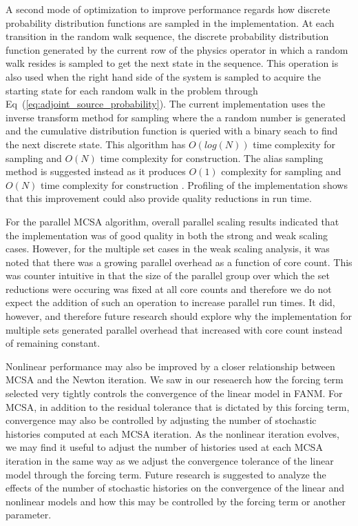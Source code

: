 A second mode of optimization to improve performance regards how
discrete probability distribution functions are sampled in the
implementation. At each transition in the random walk sequence, the
discrete probability distribution function generated by the current
row of the physics operator in which a random walk resides is sampled
to get the next state in the sequence. This operation is also used
when the right hand side of the system is sampled to acquire the
starting state for each random walk in the problem through
Eq~(\ref{eq:adjoint_source_probability}). The current implementation
uses the inverse transform method for sampling where the a random
number is generated and the cumulative distribution function is
queried with a binary seach to find the next discrete state. This
algorithm has $O(log(N))$ time complexity for sampling and $O(N)$ time
complexity for construction. The alias sampling method is suggested
instead as it produces $O(1)$ complexity for sampling and $O(N)$ time
complexity for construction \cite{smith_analysis_2005}. Profiling of
the implementation shows that this improvement could also provide
quality reductions in run time.

For the parallel MCSA algorithm, overall parallel scaling results
indicated that the implementation was of good quality in both the
strong and weak scaling cases. However, for the multiple set cases in
the weak scaling analysis, it was noted that there was a growing
parallel overhead as a function of core count. This was counter
intuitive in that the size of the parallel group over which the set
reductions were occuring was fixed at all core counts and therefore we
do not expect the addition of such an operation to increase parallel
run times. It did, however, and therefore future research should
explore why the implementation for multiple sets generated parallel
overhead that increased with core count instead of remaining constant.

Nonlinear performance may also be improved by a closer relationship
between MCSA and the Newton iteration. We saw in our reseaerch how the
forcing term selected very tightly controls the convergence of the
linear model in FANM. For MCSA, in addition to the residual tolerance
that is dictated by this forcing term, convergence may also be
controlled by adjusting the number of stochastic histories computed at
each MCSA iteration. As the nonlinear iteration evolves, we may find
it useful to adjust the number of histories used at each MCSA
iteration in the same way as we adjust the convergence tolerance of
the linear model through the forcing term. Future research is
suggested to analyze the effects of the number of stochastic histories
on the convergence of the linear and nonlinear models and how this may
be controlled by the forcing term or another parameter.

